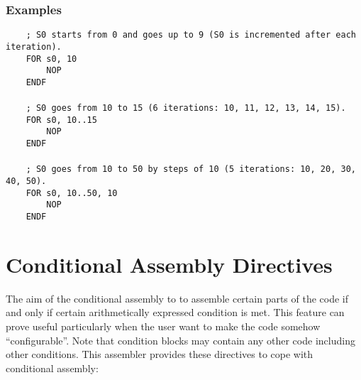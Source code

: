         \subsubsection{Examples}
            \verb'    ; S0 starts from 0 and goes up to 9 (S0 is incremented after each iteration).'\\
            \verb'    FOR s0, 10'\\
            \verb'        NOP'\\
            \verb'    ENDF'\\
            \verb''\\
            \verb'    ; S0 goes from 10 to 15 (6 iterations: 10, 11, 12, 13, 14, 15).'\\
            \verb'    FOR s0, 10..15'\\
            \verb'        NOP'\\
            \verb'    ENDF'\\
            \verb''\\
            \verb'    ; S0 goes from 10 to 50 by steps of 10 (5 iterations: 10, 20, 30, 40, 50).'\\
            \verb'    FOR s0, 10..50, 10'\\
            \verb'        NOP'\\
            \verb'    ENDF'

\clearpage
\section{Conditional Assembly Directives}
    The aim of the conditional assembly to to assemble certain parts of the code if and only if certain arithmetically expressed condition is met. This feature can prove useful particularly when the user want to make the code somehow ``configurable''. Note that condition blocks may contain any other code including other conditions. This assembler provides these directives to cope with conditional assembly:

